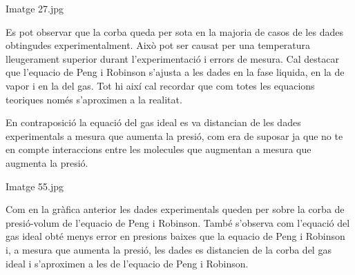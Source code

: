 \documentclass[a4paper]{article}
\begin{document}
Imatge 27.jpg

Es pot observar que la corba queda per sota en la majoria de casos de les dades obtingudes experimentalment. Això pot ser causat per una temperatura lleugerament superior durant l'experimentació i errors de mesura. Cal destacar que l'equacio de Peng i Robinson s'ajusta a les dades en la fase liquida, en la de vapor i en la del gas. Tot hi així cal recordar que com totes les equacions teoriques només s'aproximen a la realitat.

En contraposició la equació del gas ideal es va distancian de les dades experimentals a mesura que aumenta la presió, com era de suposar ja que no te en compte interaccions entre les molecules que augmentan a mesura que augmenta la presió.



Imatge 55.jpg


Com en la gràfica anterior les dades experimentals queden per sobre la corba de presió-volum de l'equacio de Peng i Robinson. També s'observa com l'equació del gas ideal obté menys error en presions baixes que la equacio de Peng i Robinson i, a mesura que aumenta la presió, les dades es distancien de la corba del gas ideal i s'aproximen a les de l'equacio de Peng i Robinson.
\end{document}
